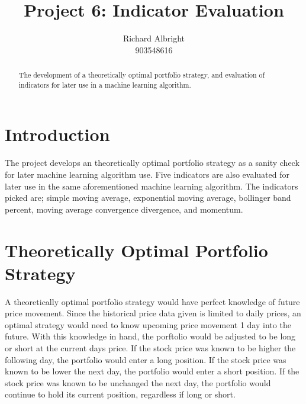 \documentclass[
	letterpaper, %
]{jdf}
\author{
	Richard Albright \\
	903548616}
\title{Project 6: Indicator Evaluation}
\begin{document}

\maketitle

\begin{abstract}
The development of a theoretically optimal portfolio strategy, and evaluation of indicators for later use in a machine learning algorithm.
\end{abstract}

\section{Introduction}
The project develops an theoretically optimal portfolio strategy as a sanity check for later machine learning algorithm use. Five indicators are also evaluated for later use in the same aforementioned machine learning algorithm.  The indicators picked are; simple moving average, exponential moving average, bollinger band percent, moving average convergence divergence, and momentum. 

\section{Theoretically Optimal Portfolio Strategy}

A theoretically optimal portfolio strategy would have perfect knowledge of future price movement.  Since the historical price data given is limited to daily prices, an optimal strategy would need to know upcoming price movement 1 day into the future.  With this knowledge in hand, the porftolio would be adjusted to be long or short at the current days price.  If the stock price was known to be higher the following day, the portfolio would enter a long position.  If the stock price was known to be lower the next day, the portfolio would enter a short position.  If the stock price was known to be unchanged the next day, the portfolio would continue to hold its current position, regardless if long or short.  
\end{document}
